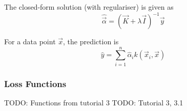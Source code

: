 The closed-form solution (with regulariser) is given as
\begin{equation*}
    \hat{\vec{\alpha}} = (
        \vec{K} + \lambda \vec{I}
    )^{-1} \vec{y}
\end{equation*}

For a data point $\vec{x}$, the prediction is
\begin{equation*}
    \hat{y} = \sum_{i=1}^n{\hat{\alpha}_i k(\vec{x}_i, \vec{x})}
\end{equation*}


\subsubsection{Loss Functions}
TODO: Functions from tutorial 3
TODO: Tutorial 3, 3.1
